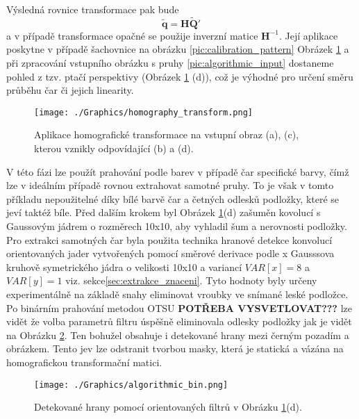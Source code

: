 \documentclass[czech, bc, kky, he, iso690numb]{fasthesis}
\begin{document}
	            Výsledná rovnice transformace pak bude 
	            	\begin{equation}
	            		\widetilde{\mathbf{q}} = \mathbf{H}\widetilde{\mathbf{Q}}'
	            	\end{equation}
	            a v případě transformace opačné se použije inverzní matice \(\mathbf{H}^{-1}\). Její aplikace poskytne v případě šachovnice na obrázku \ref{pic:calibration_pattern} Obrázek \ref{pic:algorithmic_warped} a při zpracování vstupního obrázku s pruhy \ref{pic:algorithmic_input} dostaneme pohled z tzv. ptačí perspektivy (Obrázek \ref{pic:algorithmic_warped} (d)), což je výhodné pro určení směru průběhu čar či jejich linearity.
	            
            		\begin{figure}[h]
            			\centering
            			\texttt{[image: ./Graphics/homography\_transform.png]}
            			\caption{Aplikace homografické transformace na vstupní obraz (a), (c), kterou vznikly odpovídající (b) a (d).}
            			\label{pic:algorithmic_warped}
            		\end{figure}
            	
            	V této fázi lze použít prahování podle barev v případě čar specifické barvy, čímž lze v ideálním případě rovnou extrahovat samotné pruhy. To je však v tomto příkladu nepoužitelné díky bílé barvě čar a četných odlesků podložky, které se jeví taktéž bíle. Před dalším krokem byl Obrázek \ref{pic:algorithmic_warped}(d) zašuměn kovolucí s Gaussovým jádrem o rozměrech 10x10, aby vyhladil šum a nerovnosti podložky. Pro extrakci samotných čar byla použita technika hranové detekce konvolucí orientovaných jader vytvořených pomocí směrové derivace podle x Gausssova kruhově symetrického jádra o velikosti 10x10 a variancí \(VAR[x]=8\) a \(VAR[y]=1\) viz. sekce\ref{sec:extrakce_znaceni}. Tyto hodnoty byly určeny experimentálně na základě snahy eliminovat vroubky ve snímané leské podložce. Po binárním prahování metodou OTSU \textbf{POTŘEBA VYSVETLOVAT???} lze vidět že volba parametrů filtru úspěšně eliminovala odlesky podložky jak je vidět na Obrázku \ref{pic:algorithmic_bin}. Ten bohužel obsahuje i detekované hrany mezi černým pozadím a obrázkem. Tento jev lze odstranit tvorbou masky, která je statická a vázána na homografickou transformační matici.
            		
            		\begin{figure}[h]
            			\centering
            			\texttt{[image: ./Graphics/algorithmic\_bin.png]}
            			\caption{Detekované hrany pomocí orientovaných filtrů v Obrázku \ref{pic:algorithmic_warped}(d).}
            			\label{pic:algorithmic_bin}
            		\end{figure}
            	
\end{document}

